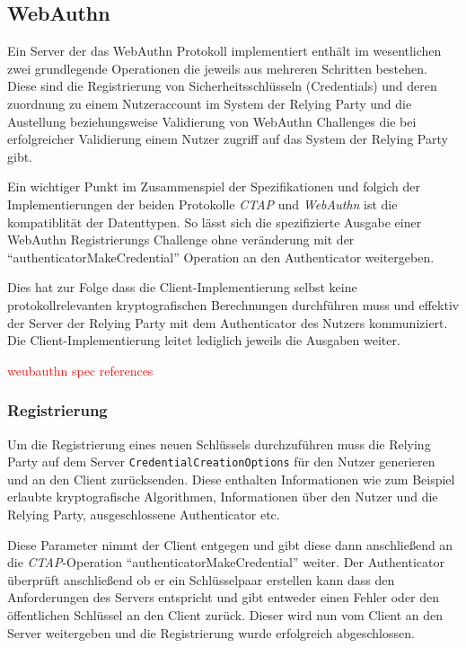 \documentclass[journal]{IEEEtran}
\begin{document}
\subsection{WebAuthn}

Ein Server der das WebAuthn Protokoll implementiert enthält im wesentlichen
zwei grundlegende Operationen die jeweils aus mehreren Schritten bestehen.
Diese sind die Registrierung von Sicherheitsschlüsseln (Credentials) und deren
zuordnung zu einem Nutzeraccount im System der Relying Party und die
Austellung beziehungsweise Validierung von WebAuthn Challenges die bei
erfolgreicher Validierung einem Nutzer zugriff auf das System der Relying Party
gibt.

Ein wichtiger Punkt im Zusammenspiel der Spezifikationen und folgich der
Implementierungen der beiden Protokolle \textit{CTAP} und \textit{WebAuthn} ist
die kompatiblität der Datenttypen. So lässt sich die spezifizierte Ausgabe
einer WebAuthn Registrierungs Challenge ohne veränderung mit der
``authenticatorMakeCredential'' Operation an den Authenticator weitergeben.

Dies hat zur Folge dass die Client-Implementierung selbst keine
protokollrelevanten kryptografischen Berechnungen durchführen muss und effektiv
der Server der Relying Party mit dem Authenticator des Nutzers kommuniziert.
Die Client-Implementierung leitet lediglich jeweils die Ausgaben weiter.

\textcolor{red}{weubauthn spec references}

\subsubsection{Registrierung}

Um die Registrierung eines neuen Schlüssels durchzuführen muss die Relying
Party auf dem Server \texttt{CredentialCreationOptions} für den Nutzer
generieren und an den Client zurücksenden. Diese enthalten Informationen wie
zum Beispiel erlaubte kryptografische Algorithmen, Informationen über den
Nutzer und die Relying Party, ausgeschlossene Authenticator etc.

Diese Parameter nimmt der Client entgegen und gibt diese dann anschließend an
die \textit{CTAP}-Operation ``authenticatorMakeCredential'' weiter. Der
Authenticator überprüft anschließend ob er ein Schlüsselpaar erstellen kann
dass den Anforderungen des Servers entspricht und gibt entweder einen Fehler
oder den öffentlichen Schlüssel an den Client zurück. Dieser wird nun vom
Client an den Server weitergeben und die Registrierung wurde erfolgreich
abgeschlossen.
\end{document}
